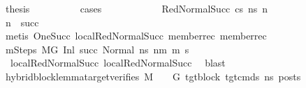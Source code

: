 \begin{isabellebody}
\ {\isacharquery}{\kern0pt}thesis\isanewline
\ \ \ \ \ \ \ \ \isamarkupfalse%
\ cases\isanewline
\ \ \ \ \ \ \ \ \ \ \isamarkupfalse%
\ {\isacharparenleft}{\kern0pt}RedNormalSucc\ cs\ ns{\isacharprime}{\kern0pt}\ n{\isacharprime}{\kern0pt}{\isacharparenright}{\kern0pt}\isanewline
\ \ \ \ \ \ \ \ \ \ \isamarkupfalse%
\ {\isachardoublequoteopen}n{\isacharprime}{\kern0pt}\ {\isacharequal}{\kern0pt}\ succ{\isachardoublequoteclose}\isanewline
\ \ \ \ \ \ \ \ \ \ \ \ \isamarkupfalse%
\ {\isacharparenleft}{\kern0pt}metis\ OneSucc\ local{\isachardot}{\kern0pt}RedNormalSucc{\isacharparenleft}{\kern0pt}{}{\isacharparenright}{\kern0pt}\ member{\isacharunderscore}{\kern0pt}rec{\isacharparenleft}{\kern0pt}{}{\isacharparenright}{\kern0pt}\ member{\isacharunderscore}{\kern0pt}rec{\isacharparenleft}{\kern0pt}{}{\isacharparenright}{\kern0pt}{\isacharparenright}{\kern0pt}\isanewline
\ \ \ \ \ \ \ \ \ \ \isamarkupfalse%
\ mSteps{\isacharcolon}{\kern0pt}\ {\isachardoublequoteopen}M{\isacharcomma}{\kern0pt}{\isasymLambda}{\isacharcomma}{\kern0pt}{\isasymGamma}{\isacharcomma}{\kern0pt}{\isasymOmega}{\isacharcomma}{\kern0pt}G\ {\isasymturnstile}{\isacharparenleft}{\kern0pt}Inl\ succ{\isacharcomma}{\kern0pt}\ Normal\ ns{\isacharprime}{\kern0pt}{\isacharparenright}{\kern0pt}\ {\isacharminus}{\kern0pt}n{\isasymrightarrow}{\isacharcircum}{\kern0pt}m\ {\isacharparenleft}{\kern0pt}m{\isacharprime}{\kern0pt}{\isacharcomma}{\kern0pt}\ s{\isacharprime}{\kern0pt}{\isacharparenright}{\kern0pt}{\isachardoublequoteclose}\isanewline
\ \ \ \ \ \ \ \ \ \ \ \ \isamarkupfalse%
\ {\isachardoublequoteopen}{}{\isachardoublequoteclose}{\isacharparenleft}{\kern0pt}{}{\isacharparenright}{\kern0pt}\ local{\isachardot}{\kern0pt}RedNormalSucc{\isacharparenleft}{\kern0pt}{}{\isacharparenright}{\kern0pt}\ local{\isachardot}{\kern0pt}RedNormalSucc{\isacharparenleft}{\kern0pt}{}{\isacharparenright}{\kern0pt}\ \isamarkupfalse%
\ blast\isanewline
\ \ \ \ \ \ \ \ \ \ \isamarkupfalse%
\ {\isachardoublequoteopen}hybrid{\isacharunderscore}{\kern0pt}block{\isacharunderscore}{\kern0pt}lemma{\isacharunderscore}{\kern0pt}target{\isacharunderscore}{\kern0pt}verifies\ M\ {\isasymLambda}\ {\isasymGamma}\ {\isasymOmega}\ G{\isacharprime}{\kern0pt}\ tgt{\isacharunderscore}{\kern0pt}block\ tgt{\isacharunderscore}{\kern0pt}cmds\ ns\ posts{\isachardoublequoteclose}\isanewline
\ \ \ \ \ \ \ \ \ \ \ \ \isamarkupfalse%

\end{isabellebody}
